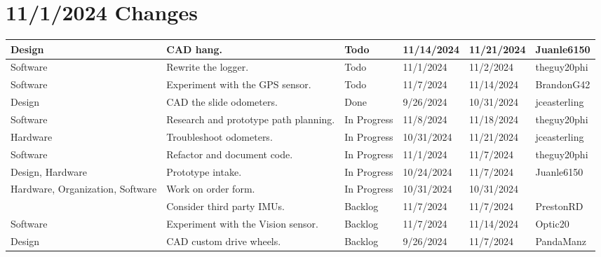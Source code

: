 \section{11/1/2024 Changes}
\begin{center}
\begin{longtable}{| p{40pt} | p{150pt} | p{35pt} | p{33pt} | p{33pt} | p{40pt} |}
\hline \rowcolor{IndianRed1}
Design & CAD hang. & Todo & 11/14/2024 & 11/21/2024 & Juanle6150 \\
\hline \rowcolor{IndianRed1}
Software & Rewrite the logger. & Todo & 11/1/2024 & 11/2/2024 & theguy20phi \\
\hline \rowcolor{IndianRed1}
Software & Experiment with the GPS sensor. & Todo & 11/7/2024 & 11/14/2024 & BrandonG42 \\
\hline \rowcolor{DarkSeaGreen1}
Design & CAD the slide odometers. & Done & 9/26/2024 & 10/31/2024 & jceasterling \\
\hline \rowcolor{LightGoldenrod1}
Software & Research and prototype path planning. & In Progress & 11/8/2024 & 11/18/2024 & theguy20phi \\
\hline \rowcolor{LightGoldenrod1}
Hardware & Troubleshoot odometers. & In Progress & 10/31/2024 & 11/21/2024 & jceasterling \\
\hline \rowcolor{LightGoldenrod1}
Software & Refactor and document code. & In Progress & 11/1/2024 & 11/7/2024 & theguy20phi \\
\hline \rowcolor{LightGoldenrod1}
Design, Hardware & Prototype intake. & In Progress & 10/24/2024 & 11/7/2024 & Juanle6150 \\
\hline \rowcolor{LightGoldenrod1}
Hardware, Organization, Software & Work on order form. & In Progress & 10/31/2024 & 10/31/2024 & \\
\hline \rowcolor{Ivory2}
& Consider third party IMUs. & Backlog & 11/7/2024 & 11/7/2024 & PrestonRD \\
\hline \rowcolor{Ivory2}
Software & Experiment with the Vision sensor. & Backlog & 11/7/2024 & 11/14/2024 & Optic20 \\
\hline \rowcolor{Ivory2}
Design & CAD custom drive wheels. & Backlog & 9/26/2024 & 11/7/2024 & PandaManz \\
\hline
\end{longtable}
\end{center}


